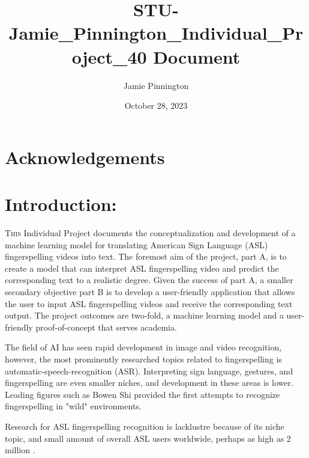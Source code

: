 \documentclass[preprint,12pt,review,authoryear]{elsarticle}
\title{STU-Jamie_Pinnington_Individual_Project_40 Document}
\author{Jamie Pinnington}
\date{October 28, 2023}
\begin{document}
\pagestyle{customStyle} %



\clearpage %

\begin{abstract}
\end{abstract}

\section{Acknowledgements}

\clearpage %

\tableofcontents
\clearpage %

\listoffigures
\clearpage %

\listoftables
\clearpage %

\section{Introduction:}

\lettrine[lines=2]{T}{his} Individual Project documents the conceptualization and development of a machine learning model for translating American Sign Language (ASL) fingerspelling videos into text. The foremost aim of the project, part A, is to create a model that can interpret ASL fingerspelling video and predict the corresponding text to a realistic degree. Given the success of part A, a smaller secondary objective part B is to develop a user-friendly application that allows the user to input ASL fingerspelling videos and receive the corresponding text output. The project outcomes are two-fold, a machine learning model and a user-friendly proof-of-concept that serves academia.

The field of AI has seen rapid development in image and video recognition, however, the most prominently researched topics related to fingerspelling is automatic-speech-recognition (ASR). Interpreting sign language, gestures, and fingerspelling are even smaller niches, and development in these areas is lower. Leading figures such as Bowen Shi \cite{shiFingerspellingDetectionAmerican2021} provided the first attempts to recognize fingerspelling in "wild" environments.

Research for ASL fingerspelling recognition is lacklustre because of its niche topic, and small amount of overall ASL users worldwide, perhaps as high as 2 million \cite{mitchellHowManyPeople2006, ethnologueAmericanSignLanguage2023}. 
\end{document}
